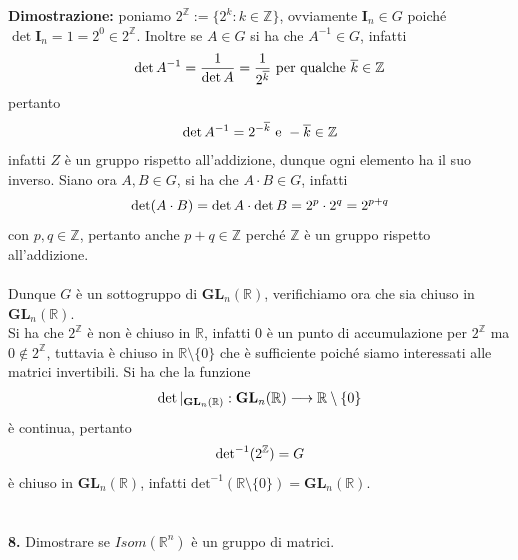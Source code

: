 \documentclass{article}
\begin{document}
\textbf{Dimostrazione:} poniamo $2^{\mathbb{Z}} := \{ 2^k : k \in \mathbb{Z} \}$, ovviamente $\mathbf{I}_n \in G$ poiché $\det \mathbf{I}_n = 1 = 2^0 \in 2^{\mathbb{Z}}$. Inoltre se $A \in G$ si ha che $A^{-1} \in G$, infatti
\begin{gather}
    \det A^{-1} = \frac{1}{\det A} = \frac{1}{2^{\overline{k}}} \text{ per qualche } \overline{k} \in \mathbb{Z} \notag
\end{gather}
pertanto
\begin{gather}
    \det A^{-1} = 2^{-\overline{k}} \text{ e } -\overline{k} \in \mathbb{Z} \notag
\end{gather}
infatti $Z$ è un gruppo rispetto all'addizione, dunque ogni elemento ha il suo inverso. Siano ora $A, B \in G$, si ha che $A \cdot B \in G$, infatti
\begin{gather}
    \det (A \cdot B) = \det A \cdot \det B = 2^p \cdot 2^q = 2^{p + q} \notag
\end{gather}
con $p, q \in \mathbb{Z}$, pertanto anche $p + q \in \mathbb{Z}$ perché $\mathbb{Z}$ è un gruppo rispetto all'addizione. \\ \\
Dunque $G$ è un sottogruppo di $\mathbf{GL}_n(\mathbb{R})$, verifichiamo ora che sia chiuso in $\mathbf{GL}_n(\mathbb{R})$. \\
Si ha che $2^{\mathbb{Z}}$ è non è chiuso in $\mathbb{R}$, infatti $0$ è un punto di accumulazione per $2^{\mathbb{Z}}$ ma $0 \not\in 2^{\mathbb{Z}}$, tuttavia è chiuso in $\mathbb{R} \setminus \{ 0 \}$ che è sufficiente poiché siamo interessati alle matrici invertibili. Si ha che la funzione
\begin{gather}
    \det|_{\mathbf{GL}_n(\mathbb{R})} : \mathbf{GL}_n(\mathbb{R}) \longrightarrow \mathbb{R} \setminus \{ 0 \} \notag
\end{gather}
è continua, pertanto
\begin{gather}
    \mathrm{det}^{-1}(2^{\mathbb{Z}}) = G \notag
\end{gather}
è chiuso in $\mathbf{GL}_n(\mathbb{R})$, infatti $\mathrm{det}^{-1}(\mathbb{R} \setminus \{ 0 \}) = \mathbf{GL}_n(\mathbb{R})$. \\ \\ \\
\textbf{8.} Dimostrare se $Isom(\mathbb{R}^n)$ è un gruppo di matrici. \\
\end{document}
